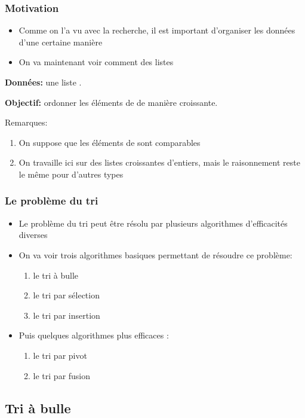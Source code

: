 \documentclass[12pt]{linfo-beamer}
\begin{document}
\begin{frame}
\frametitle{Motivation}
\begin{itemize}%
    \item Comme on l'a vu avec la recherche, il est important
      d'organiser les données d'une certaine manière
    \item On va maintenant voir comment  des listes
\end{itemize}
\begin{probleme}[tri]%
\textbf{Données:} une liste .

\textbf{Objectif:} ordonner les éléments de  de manière croissante.
\end{probleme}
Remarques:
\begin{enumerate}
\item On suppose que les éléments de  sont comparables
\item On travaille ici sur des listes croissantes d'entiers, mais le
raisonnement reste le même pour d'autres types
\end{enumerate}
\end{frame}


\begin{frame}
  \frametitle{Le problème du tri}
  \begin{itemize}
  \item Le problème du tri peut être résolu par plusieurs algorithmes
  d'efficacités diverses
  \item On va voir trois algorithmes basiques permettant de résoudre ce
    problème:
    \begin{enumerate}
    \item le tri à bulle
    \item le tri par sélection
    \item le tri par insertion
    \end{enumerate}
  \item Puis quelques algorithmes plus efficaces :
    \begin{enumerate}
    \item le tri par pivot
    \item le tri par fusion
    \end{enumerate}
  \end{itemize}
\end{frame}


\subsection{Tri à bulle}
\label{sub:tri_à_bulle}
\end{document}

